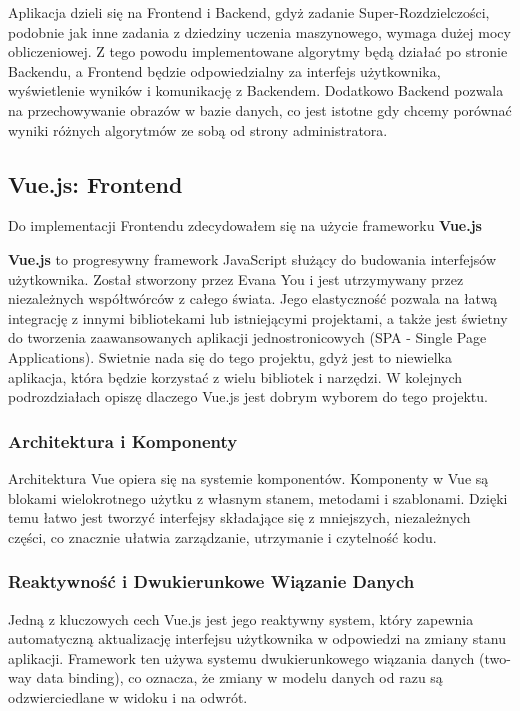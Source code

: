 Aplikacja dzieli się na Frontend i Backend, gdyż zadanie Super-Rozdzielczości, podobnie jak inne zadania z dziedziny uczenia maszynowego, wymaga dużej mocy obliczeniowej. Z tego powodu implementowane algorytmy będą działać po stronie Backendu, a Frontend będzie odpowiedzialny za interfejs użytkownika, wyświetlenie wyników i komunikację z Backendem. 
Dodatkowo Backend pozwala na przechowywanie obrazów w bazie danych, co jest istotne gdy chcemy porównać wyniki różnych algorytmów ze sobą od strony administratora.


\subsection{Vue.js: Frontend}

Do implementacji Frontendu zdecydowałem się na użycie frameworku \textbf{Vue.js}


\textbf{Vue.js} to progresywny framework JavaScript służący do budowania interfejsów użytkownika. Został stworzony przez Evana You i jest utrzymywany przez niezależnych współtwórców z całego świata. Jego elastyczność pozwala na łatwą integrację z innymi bibliotekami lub istniejącymi projektami, a także jest świetny do tworzenia zaawansowanych aplikacji jednostronicowych (SPA - Single Page Applications). Swietnie nada się do tego projektu, gdyż jest to niewielka aplikacja, która będzie korzystać z wielu bibliotek i narzędzi. W kolejnych podrozdziałach opiszę dlaczego Vue.js jest dobrym wyborem do tego projektu.


\subsubsection*{Architektura i Komponenty}

Architektura Vue opiera się na systemie komponentów. Komponenty w Vue są blokami wielokrotnego użytku z własnym stanem, metodami i szablonami. Dzięki temu łatwo jest tworzyć interfejsy składające się z mniejszych, niezależnych części, co znacznie ułatwia zarządzanie, utrzymanie i czytelność kodu.

\subsubsection*{Reaktywność i Dwukierunkowe Wiązanie Danych}

Jedną z kluczowych cech Vue.js jest jego reaktywny system, który zapewnia automatyczną aktualizację interfejsu użytkownika w odpowiedzi na zmiany stanu aplikacji. Framework ten używa systemu dwukierunkowego wiązania danych (two-way data binding), co oznacza, że zmiany w modelu danych od razu są odzwierciedlane w widoku i na odwrót.

